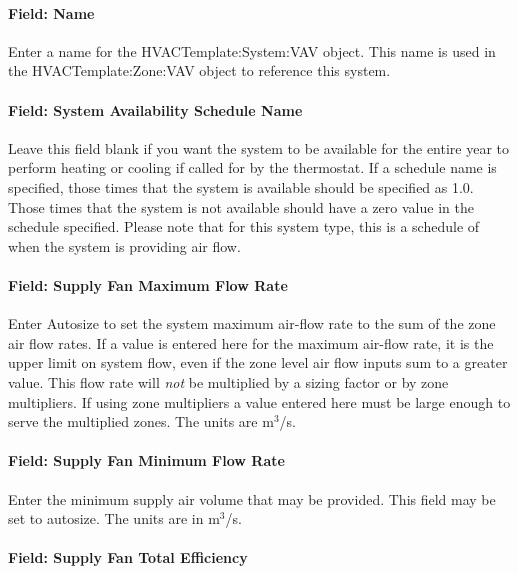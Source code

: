 \paragraph{Field: Name}\label{field-name-5-010}

Enter a name for the HVACTemplate:System:VAV object. This name is used in the HVACTemplate:Zone:VAV object to reference this system.

\paragraph{Field: System Availability Schedule Name}\label{field-system-availability-schedule-name-10}

Leave this field blank if you want the system to be available for the entire year to perform heating or cooling if called for by the thermostat. If a schedule name is specified, those times that the system is available should be specified as 1.0. Those times that the system is not available should have a zero value in the schedule specified. Please note that for this system type, this is a schedule of when the system is providing air flow.

\paragraph{Field: Supply Fan Maximum Flow Rate}\label{field-supply-fan-maximum-flow-rate-1}

Enter Autosize to set the system maximum air-flow rate to the sum of the zone air flow rates. If a value is entered here for the maximum air-flow rate, it is the upper limit on system flow, even if the zone level air flow inputs sum to a greater value. This flow rate will \emph{not} be multiplied by a sizing factor or by zone multipliers. If using zone multipliers a value entered here must be large enough to serve the multiplied zones. The units are m\(^{3}\)/s.

\paragraph{Field: Supply Fan Minimum Flow Rate}\label{field-supply-fan-minimum-flow-rate}

Enter the minimum supply air volume that may be provided. This field may be set to autosize. The units are in m\(^{3}\)/s.

\paragraph{Field: Supply Fan Total Efficiency}\label{field-supply-fan-total-efficiency-8}

